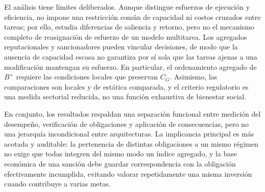 El análisis tiene límites deliberados. Aunque distingue esfuerzos de ejecución y eficiencia, no impone una restricción común de capacidad ni costos cruzados entre tareas; por ello, estudia diferencias de saliencia y retorno, pero no el mecanismo completo de reasignación de esfuerzo de un modelo multitarea. Los agregados reputacionales y sancionadores pueden vincular decisiones, de modo que la ausencia de capacidad escasa no garantiza por sí sola que las tareas ajenas a una modificación mantengan su esfuerzo. En particular, el ordenamiento agregado de \(B^+\) requiere las condiciones locales que preservan \(C_G\). Asimismo, las comparaciones son locales y de estática comparada, y el criterio regulatorio es una medida sectorial reducida, no una función exhaustiva de bienestar social.

En conjunto, los resultados respaldan una separación funcional entre medición del desempeño, verificación de obligaciones y aplicación de consecuencias, pero no una jerarquía incondicional entre arquitecturas. La implicancia principal es más acotada y auditable: la pertenencia de distintas obligaciones a un mismo régimen no exige que todas integren del mismo modo un índice agregado, y la base económica de una sanción debe guardar correspondencia con la obligación efectivamente incumplida, evitando valorar repetidamente una misma inversión cuando contribuye a varias metas.
